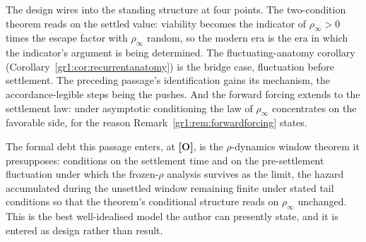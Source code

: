 \documentclass[11pt]{article}
\numberwithin{equation}{section}
\theoremstyle{plain}
\theoremstyle{definition}
\theoremstyle{remark}
\begin{document}
The design wires into the standing structure at four points. The
two-condition theorem reads on the settled value: viability becomes
the indicator of $\rho_\infty>0$ times the escape factor with
$\rho_\infty$ random, so the modern era is the era in which the
indicator's argument is being determined. The fluctuating-anatomy
corollary (Corollary~\ref{gr1:cor:recurrentanatomy}) is the bridge
case, fluctuation before settlement. The preceding passage's
identification gains its mechanism, the accordance-legible steps
being the pushes. And the forward forcing extends to the settlement
law: under asymptotic conditioning the law of $\rho_\infty$
concentrates on the favorable side, for the reason
Remark~\ref{gr1:rem:forwardforcing} states.

The formal debt this passage enters, at \textbf{[O]}, is the
$\rho$-dynamics window theorem it presupposes: conditions on the
settlement time and on the pre-settlement fluctuation under which
the frozen-$\rho$ analysis survives as the limit, the hazard
accumulated during the unsettled window remaining finite under
stated tail conditions so that the theorem's conditional structure
reads on $\rho_\infty$ unchanged. This is the best well-idealised
model the author can presently state, and it is entered as design
rather than result.
\end{document}
